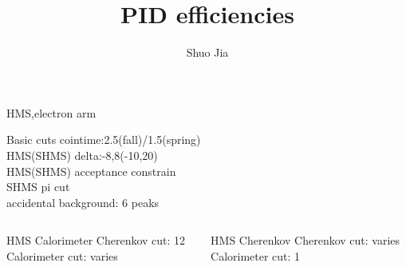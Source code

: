\documentclass[aspectratio=169,xcolor=dvipsnames]{beamer}
\title{PID efficiencies}
\date{}
\author{Shuo Jia}
\begin{document}
\maketitle




\begin{frame}{HMS,electron arm}
  \begin{block}{Basic cuts}
    cointime:2.5(fall)/1.5(spring) \\
    HMS(SHMS) delta:-8,8(-10,20)  \\
    HMS(SHMS) acceptance constrain \\
    SHMS pi cut \\
    accidental background: 6 peaks \\
  \end{block}
  \begin{columns}
    \begin{column}[T]{0.5\textwidth}
     \begin{block}{HMS Calorimeter}
       Cherenkov cut: 12 \\
       Calorimeter cut: varies
     \end{block}
   \end{column}
   \begin{column}[T]{0.5\textwidth}
     \begin{block}{HMS Cherenkov}
       Cherenkov cut: varies \\
       Calorimeter cut: 1
       \end{block}
     \end{column}
   \end{columns}

\end{frame}
\end{document}

